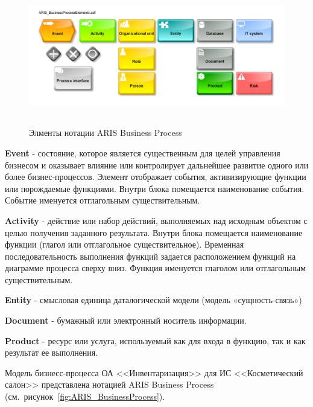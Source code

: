 \begin{figure}[!h]
    \centering
  
    \includegraphics[height=6cm]
    {assets/ARIS/ARIS_BusinessProcessElements.adf.pdf}
    
    \caption{Элменты нотации ARIS Business Process}
    
    \label{fig:MBP_Product}
\end{figure}

\textbf{Event} - состояние, которое является существенным для целей управления бизнесом
и оказывает влияние или контролирует дальнейшее развитие одного или более бизнес-процессов.
Элемент отображает события, активизирующие функции или порождаемые функциями.
Внутри блока помещается наименование события.
Событие именуется отглагольным существительным.

\textbf{Activity} - действие или набор действий, выполняемых над исходным объектом с целью получения заданного результата.
Внутри блока помещается наименование функции (глагол или отглагольное существительное).
Временная последовательность выполнения функций задается расположением функций на диаграмме процесса сверху вниз.
Функция именуется глаголом или отглагольным существительным.

\textbf{Entity} - смысловая единица даталогической модели (модель «сущность-связь»)

\textbf{Document} - бумажный или электронный носитель информации.

\textbf{Product} - ресурс или услуга, используемый как для входа в функцию, так и как результат ее выполнения.

Модель бизнесс-процесса ОА <<Инвентаризация>> для ИС <<Косметический салон>> представлена нотацией ARIS Business Process
(см.~рисунок~\ref{fig:ARIS_BusinessProcess}).

\newpage

